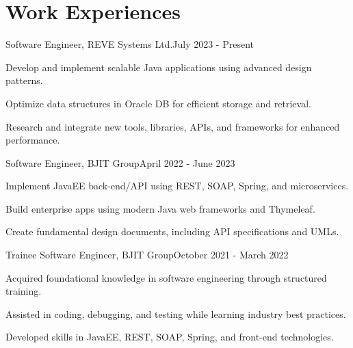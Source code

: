 \section{\textbf{Work Experiences}}
\begin{joblong}
{Software Engineer, REVE Systems Ltd.}{July 2023 - Present}
    \item Develop and implement scalable Java applications using advanced design patterns.
    \item Optimize data structures in Oracle DB for efficient storage and retrieval.
    \item Research and integrate new tools, libraries, APIs, and frameworks for enhanced performance.
\end{joblong}

\begin{joblong}
{Software Engineer, BJIT Group}{April 2022 - June 2023}
    \item Implement JavaEE back-end/API using REST, SOAP, Spring, and microservices.
    \item Build enterprise apps using modern Java web frameworks and Thymeleaf.
    \item Create fundamental design documents, including API specifications and UMLs.
\end{joblong}

\begin{joblong}
{Trainee Software Engineer, BJIT Group}{October 2021 - March 2022}
    \item Acquired foundational knowledge in software engineering through structured training.
    \item Assisted in coding, debugging, and testing while learning industry best practices.
    \item Developed skills in JavaEE, REST, SOAP, Spring, and front-end technologies.
\end{joblong}
